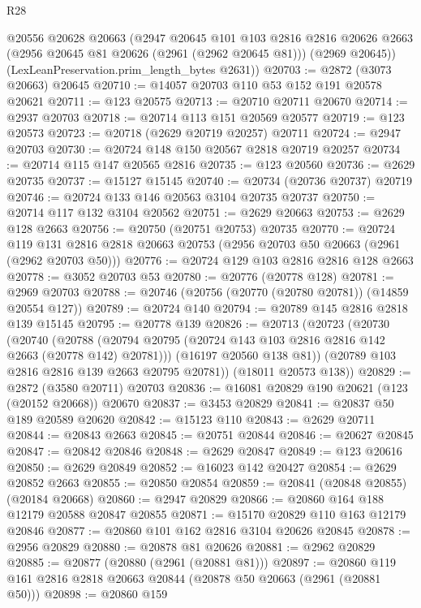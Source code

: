 \begin{lexlean}{R28}
\begin{coremodule}
      @20556
      @20628
      @20663
      (@2947
        @20645
        @101
        @103
        @2816
        @2816
        @20626
        @2663
        (@2956 @20645 @81 @20626 (@2961 (@2962 @20645 @81)))
        (@2969 @20645))
      (LexLeanPreservation.prim_length_bytes @2631))
@20703 := @2872 (@3073 @20663) @20645
@20710 := @14057 @20703 @110 @53 @152 @191 @20578 @20621
@20711 := @123 @20575
@20713 := @20710 @20711 @20670
@20714 := @2937 @20703
@20718 := @20714 @113 @151 @20569 @20577
@20719 := @123 @20573
@20723 := @20718 (@2629 @20719 @20257) @20711
@20724 := @2947 @20703
@20730 := @20724 @148 @150 @20567 @2818 @20719 @20257
@20734 := @20714 @115 @147 @20565 @2816
@20735 := @123 @20560
@20736 := @2629 @20735
@20737 := @15127 @15145
@20740 := @20734 (@20736 @20737) @20719
@20746 := @20724 @133 @146 @20563 @3104 @20735 @20737
@20750 := @20714 @117 @132 @3104 @20562
@20751 := @2629 @20663
@20753 := @2629 @128 @2663
@20756 := @20750 (@20751 @20753) @20735
@20770 := @20724
    @119
    @131
    @2816
    @2818
    @20663
    @20753
    (@2956 @20703 @50 @20663 (@2961 (@2962 @20703 @50)))
@20776 := @20724 @129 @103 @2816 @2816 @128 @2663
@20778 := @3052 @20703 @53
@20780 := @20776 (@20778 @128)
@20781 := @2969 @20703
@20788 := @20746 (@20756 (@20770 (@20780 @20781)) (@14859 @20554 @127))
@20789 := @20724 @140
@20794 := @20789 @145 @2816 @2818 @139 @15145
@20795 := @20778 @139
@20826 := @20713
    (@20723
      (@20730
        (@20740
          (@20788 (@20794 @20795 (@20724 @143 @103 @2816 @2816 @142 @2663 (@20778 @142) @20781)))
          (@16197 @20560 @138 @81))
        (@20789 @103 @2816 @2816 @139 @2663 @20795 @20781))
      (@18011 @20573 @138))
@20829 := @2872 (@3580 @20711) @20703
@20836 := @16081 @20829 @190 @20621 (@123 (@20152 @20668)) @20670
@20837 := @3453 @20829
@20841 := @20837 @50 @189 @20589 @20620
@20842 := @15123 @110
@20843 := @2629 @20711
@20844 := @20843 @2663
@20845 := @20751 @20844
@20846 := @20627 @20845
@20847 := @20842 @20846
@20848 := @2629 @20847
@20849 := @123 @20616
@20850 := @2629 @20849
@20852 := @16023 @142 @20427
@20854 := @2629 @20852 @2663
@20855 := @20850 @20854
@20859 := @20841 (@20848 @20855) (@20184 @20668)
@20860 := @2947 @20829
@20866 := @20860 @164 @188 @12179 @20588 @20847 @20855
@20871 := @15170 @20829 @110 @163 @12179 @20846
@20877 := @20860 @101 @162 @2816 @3104 @20626 @20845
@20878 := @2956 @20829
@20880 := @20878 @81 @20626
@20881 := @2962 @20829
@20885 := @20877 (@20880 (@2961 (@20881 @81)))
@20897 := @20860 @119 @161 @2816 @2818 @20663 @20844 (@20878 @50 @20663 (@2961 (@20881 @50)))
@20898 := @20860 @159

\end{coremodule}
\end{lexlean}

